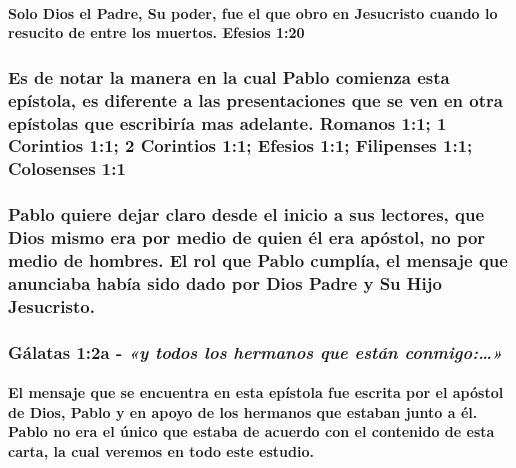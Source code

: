 \documentclass[11a pt,twoside]{article}
\newcommand{\scripture}[1]{%
  {\fontsize{12pt}{16pt}\selectfont\ScriptureFont\itshape #1}%
}
\let\oldsubsubsection\subsubsection
\renewcommand{\subsubsection}{\needspace{4\baselineskip}\oldsubsubsection}
\let\oldparagraph\paragraph
\renewcommand{\paragraph}{\needspace{3\baselineskip}\oldparagraph}
\begin{document}
\paragraph{Solo Dios el Padre, Su poder, fue el que obro en Jesucristo
cuando lo resucito de entre los muertos. Efesios
1:20}\label{solo-dios-el-padre-su-poder-fue-el-que-obro-en-jesucristo-cuando-lo-resucito-de-entre-los-muertos.-efesios-120}

\subsubsection{Es de notar la manera en la cual Pablo comienza esta
epístola, es diferente a las presentaciones que se ven en otra epístolas
que escribiría mas adelante. Romanos 1:1; 1 Corintios 1:1; 2 Corintios
1:1; Efesios 1:1; Filipenses 1:1; Colosenses
1:1}\label{es-de-notar-la-manera-en-la-cual-pablo-comienza-esta-epuxedstola-es-diferente-a-las-presentaciones-que-se-ven-en-otra-epuxedstolas-que-escribiruxeda-mas-adelante.-romanos-11-1-corintios-11-2-corintios-11-efesios-11-filipenses-11-colosenses-11}

\subsubsection{Pablo quiere dejar claro desde el inicio a sus lectores,
que Dios mismo era por medio de quien él era apóstol, no por medio de
hombres. El rol que Pablo cumplía, el mensaje que anunciaba había sido
dado por Dios Padre y Su Hijo
Jesucristo.}\label{pablo-quiere-dejar-claro-desde-el-inicio-a-sus-lectores-que-dios-mismo-era-por-medio-de-quien-uxe9l-era-apuxf3stol-no-por-medio-de-hombres.-el-rol-que-pablo-cumpluxeda-el-mensaje-que-anunciaba-habuxeda-sido-dado-por-dios-padre-y-su-hijo-jesucristo.}

\subsubsection{\texorpdfstring{Gálatas 1:2a -
\scripture{«y todos los hermanos que están conmigo:…»}}{Gálatas 1:2a - }}\label{guxe1latas-12a---y-todos-los-hermanos-que-estuxe1n-conmigo}

\paragraph{El mensaje que se encuentra en esta epístola fue escrita por
el apóstol de Dios, Pablo y en apoyo de los hermanos que estaban junto a
él. Pablo no era el único que estaba de acuerdo con el contenido de esta
carta, la cual veremos en todo este
estudio.}\label{el-mensaje-que-se-encuentra-en-esta-epuxedstola-fue-escrita-por-el-apuxf3stol-de-dios-pablo-y-en-apoyo-de-los-hermanos-que-estaban-junto-a-uxe9l.-pablo-no-era-el-uxfanico-que-estaba-de-acuerdo-con-el-contenido-de-esta-carta-la-cual-veremos-en-todo-este-estudio.}
\end{document}
